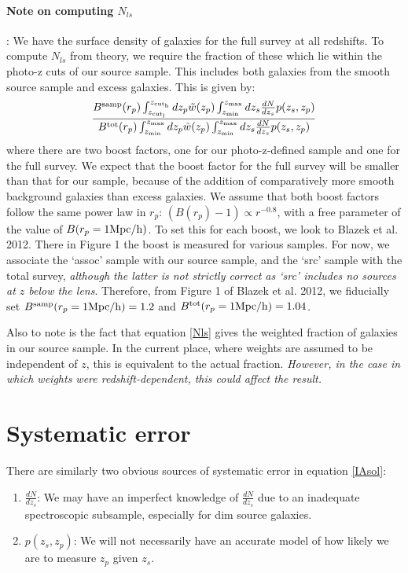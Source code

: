 \documentclass[onecolumn,amsmath,aps,fleqn, superscriptaddress]{revtex4}
\begin{document}
\paragraph{Note on computing $N_{ls}$}: We have the surface density of galaxies for the full survey at all redshifts. To compute $N_{ls}$ from theory, we require the fraction of these which lie within the photo-z cuts of our source sample. This includes both galaxies from the smooth source sample and excess galaxies. This is given by:
\begin{equation}
\frac{B^{\rm samp}(r_p) \int_{z_{\rm cut_l}}^{z_{\rm cut_h}} dz_p \tilde{w}(z_p) \int_{z_{\rm min}}^{z_{\rm max}} dz_s \frac{dN}{dz_s}p(z_s, z_p)}{B^{\rm tot}(r_p) \int_{z_{\rm min}}^{z_{\rm max}} dz_p \tilde{w}(z_p) \int_{z_{\rm min}}^{z_{\rm max}} dz_s \frac{dN}{dz_s}p(z_s, z_p)}
\label{Nls}
\end{equation}
where there are two boost factors, one for our photo-z-defined sample and one for the full survey. We expect that the boost factor for the full survey will be smaller than that for our sample, because of the addition of comparatively more smooth background galaxies than excess galaxies. We assume that both boost factors follow the same power law in $r_p$: $(B(r_p)-1) \propto r^{-0.8}$, with a free parameter of the value of $B(r_p = 1 {\rm Mpc/h})$. To set this for each boost, we look to Blazek et al. 2012. There in Figure 1 the boost is measured for various samples. For now, we associate the `assoc' sample with our source sample, and the `src' sample with the total survey, {\it although the latter is not strictly correct as `src' includes no sources at $z$ below the lens}. Therefore, from Figure 1 of Blazek et al. 2012, we fiducially set $B^{\rm samp}(r_p = 1 {\rm Mpc/h}) = 1.2$ and $B^{\rm tot}(r_p = 1 {\rm Mpc/h}) = 1.04$.

Also to note is the fact that equation \ref{Nls} gives the weighted fraction of galaxies in our source sample. In the current place, where weights are assumed to be independent of $z$, this is equivalent to the actual fraction. {\it However, in the case in which weights were redshift-dependent, this could affect the result.}

\section*{Systematic error}

There are similarly two obvious sources of systematic error in equation \ref{IAsol}:
\begin{enumerate}
\item{$\frac{dN}{dz_s}$: We may have an imperfect knowledge of $\frac{dN}{dz_s}$ due to an inadequate spectroscopic subsample, especially for dim source galaxies.}
\item{$p(z_s, z_p)$: We will not necessarily have an accurate model of how likely we are to measure $z_p$ given $z_s$.}
\end{enumerate}
\end{document}
